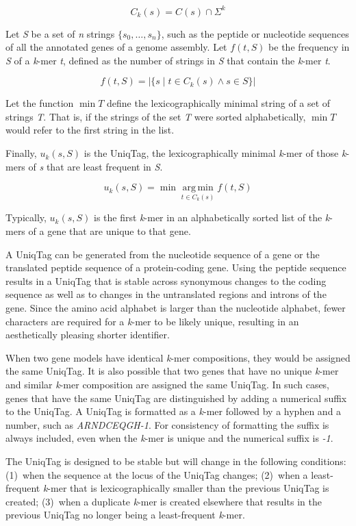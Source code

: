 \documentclass[10pt]{article}
\begin{document}
\[
C_k(s) = C(s) \cap \Sigma^k
\]

Let \emph{S} be a set of \emph{n} strings \(\{s_0, \dots, s_n\}\), such
as the peptide or nucleotide sequences of all the annotated genes of a
genome assembly. Let \(f(t, S)\) be the frequency in \emph{S} of a
\emph{k}-mer \emph{t}, defined as the number of strings in \emph{S} that
contain the \emph{k}-mer \emph{t}.

\[
f(t, S) = \left\vert \{ s \mid t \in C_k(s) \wedge s \in S \} \right\vert
\]

Let the function \(\min T\) define the lexicographically minimal string
of a set of strings \emph{T}. That is, if the strings of the set
\emph{T} were sorted alphabetically, \(\min T\) would refer to the first
string in the list.

Finally, \(u_k(s, S)\) is the UniqTag, the lexicographically minimal
\emph{k}-mer of those \emph{k}-mers of \emph{s} that are least frequent
in \emph{S}.

\[
u_k(s, S) = \min \mathop{\arg\,\min}\limits_{t \in C_k(s)} f(t, S)
\]

Typically, \(u_k(s, S)\) is the first \emph{k}-mer in an alphabetically
sorted list of the \emph{k}-mers of a gene that are unique to that gene.

A UniqTag can be generated from the nucleotide sequence of a gene or the
translated peptide sequence of a protein-coding gene. Using the peptide
sequence results in a UniqTag that is stable across synonymous changes
to the coding sequence as well as to changes in the untranslated regions
and introns of the gene. Since the amino acid alphabet is larger than
the nucleotide alphabet, fewer characters are required for a
\emph{k}-mer to be likely unique, resulting in an aesthetically pleasing
shorter identifier.

When two gene models have identical \emph{k}-mer compositions, they
would be assigned the same UniqTag. It is also possible that two genes
that have no unique \emph{k}-mer and similar \emph{k}-mer composition
are assigned the same UniqTag. In such cases, genes that have the same
UniqTag are distinguished by adding a numerical suffix to the UniqTag. A
UniqTag is formatted as a \emph{k}-mer followed by a hyphen and a
number, such as \emph{ARNDCEQGH-1}. For consistency of formatting the
suffix is always included, even when the \emph{k}-mer is unique and the
numerical suffix is \emph{-1}.

The UniqTag is designed to be stable but will change in the following
conditions: (1)~when the sequence at the locus of the UniqTag changes;
(2)~when a least-frequent \emph{k}-mer that is lexicographically smaller
than the previous UniqTag is created; (3)~when a duplicate \emph{k}-mer
is created elsewhere that results in the previous UniqTag no longer
being a least-frequent \emph{k}-mer.
\end{document}

